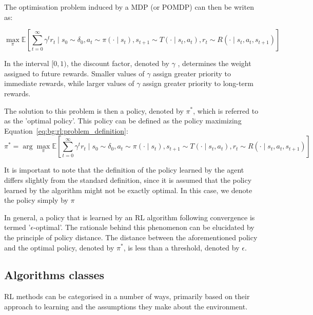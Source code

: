 The optimisation problem induced by a MDP (or POMDP) can then be writen as:

\begin{equation}\label{eq:bg:rl:problem_definition}
    \max_\pi \mathbb{E} \left[ \sum_{t=0}^\infty \gamma^t r_t \mid s_0 \sim \delta_0, a_t \sim \pi(\cdot \mid s_t), s_{t+1} \sim T(\cdot \mid s_t, a_t), r_t \sim R(\cdot \mid s_t, a_t, s_{t+1}) \right]
\end{equation}

In the interval $[0,1)$, the discount factor, denoted by $\gamma$ , determines the weight assigned to future rewards.
Smaller values of $\gamma$ assign greater priority to immediate rewards, while larger values of $\gamma$ assign greater
priority to long-term rewards.

The solution to this problem is then a policy, denoted by $\pi^*$, which is referred to as the 'optimal policy'.
This policy can be defined as the policy maximizing Equation~\ref{eq:bg:rl:problem_definition}:
\begin{equation}\label{eq:bg:rl:optimal_policy}
    \pi^* = \arg\max_\pi \mathbb{E} \left[ \sum_{t=0}^\infty \gamma^t r_t \mid s_0 \sim \delta_0, a_t \sim \pi(\cdot \mid s_t), s_{t+1} \sim T(\cdot \mid s_t, a_t), r_t \sim R(\cdot \mid s_t, a_t, s_{t+1}) \right]
\end{equation}

It is important to note that the definition of the policy learned by the agent differs slightly from the standard
definition, since it is assumed that the policy learned by the algorithm might not be exactly optimal.
In this case, we denote the policy simply by $\pi$

In general, a policy that is learned by an RL algorithm following convergence is termed '$\epsilon$-optimal'.
The rationale behind this phenomenon can be elucidated by the principle of policy distance.
The distance between the aforementioned policy and the optimal policy, denoted by $\pi^*$, is less than a threshold,
denoted by $\epsilon$.

\subsection{Algorithms classes}\label{subsection:bg:rl:algs}

RL methods can be categorised in a number of ways, primarily based on their approach to learning and the assumptions
they make about the environment.

